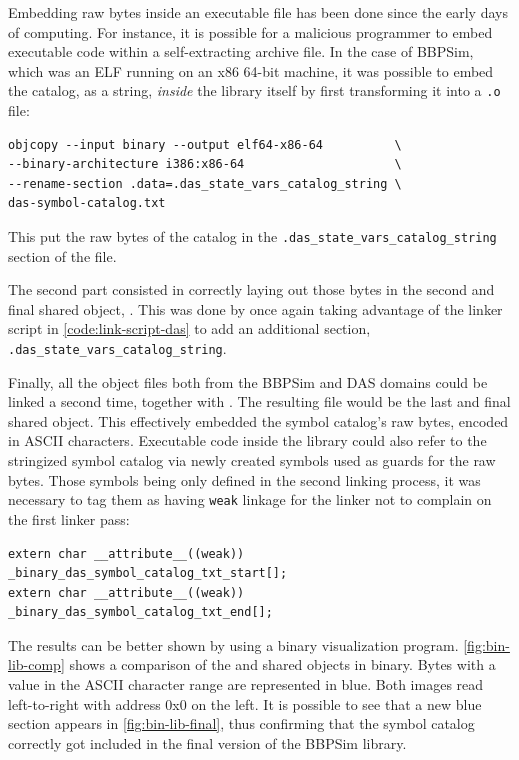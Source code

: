 {Embedding raw bytes inside an executable file has been done since the early days of computing. For instance, it is possible for a malicious programmer to embed executable code within a self-extracting archive file\cite{online:sfx}. In the case of BBPSim, which was an ELF running on an x86 64-bit machine, it was possible to embed the catalog, as a string, \textit{inside} the library itself by first transforming it into a \texttt{.o} file:
\begin{verbatim}
objcopy --input binary --output elf64-x86-64          \
--binary-architecture i386:x86-64                     \
--rename-section .data=.das_state_vars_catalog_string \
das-symbol-catalog.txt                                
\end{verbatim}

This put the raw bytes of the catalog in the \texttt{.das_state_vars_catalog_string} section of the  file.

The second part consisted in correctly laying out those bytes in the second and final shared object, . This was done by once again taking advantage of the linker script in \autoref{code:link-script-das} to add an additional section, \texttt{.das_state_vars_catalog_string}.

Finally, all the object files both from the BBPSim and DAS domains could be linked a second time, together with . The resulting  file would be the last and final shared object. This effectively embedded the symbol catalog's raw bytes, encoded in \gls{ASCII} characters. Executable code inside the library could also refer to the stringized symbol catalog via newly created symbols used as guards for the raw bytes. Those symbols being only defined in the second linking process, it was necessary to tag them as having \texttt{weak} linkage for the linker not to complain on the first linker pass:
\begin{verbatim}
extern char __attribute__((weak)) _binary_das_symbol_catalog_txt_start[];
extern char __attribute__((weak)) _binary_das_symbol_catalog_txt_end[];
\end{verbatim}

The results can be better shown by using a binary visualization program\cite{online:binvisio}. \autoref{fig:bin-lib-comp} shows a comparison of the  and  shared objects in binary. Bytes with a value in the \gls{ASCII} character range are represented in blue. Both images read left-to-right with address 0x0 on the left. It is possible to see that a new blue section appears in \autoref{fig:bin-lib-final}, thus confirming that the symbol catalog correctly got included in the final version of the BBPSim library.

}
